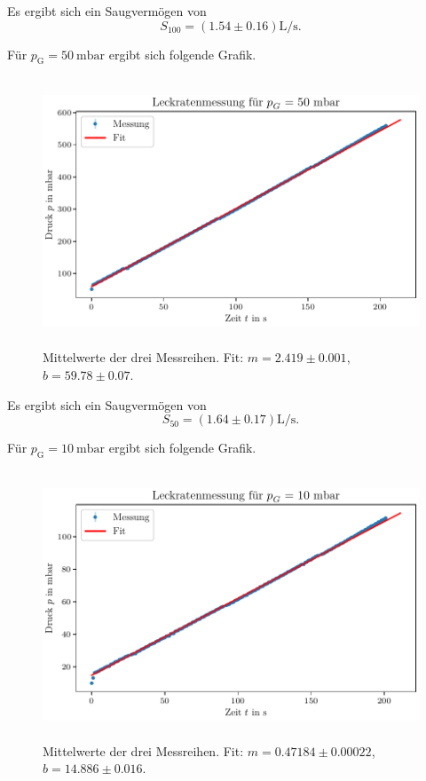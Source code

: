Es ergibt sich ein Saugvermögen von
\begin{equation}
    S_{100} = (\num{1.54} \pm \num{0.16}) \si{\liter\per\second}.
\end{equation}

Für $p_\text{G} = \SI{50}{\milli\bar}$ ergibt sich folgende Grafik.

\begin{figure}[H]
    \centering
    \includegraphics[width=\textwidth,height=8cm]{plots/DP_Leck_50mbar.pdf}
    \caption{Mittelwerte der drei Messreihen. Fit: $m = \num{2.419} \pm \num{0.001}$, $b = \num{59.78} \pm \num{0.07}$.}
    \label{fig:DP_Leck_50mbar_mittelwert}
\end{figure}

Es ergibt sich ein Saugvermögen von
\begin{equation}
    S_{50} = (\num{1.64} \pm \num{0.17}) \si{\liter\per\second}.
\end{equation}

Für $p_\text{G} = \SI{10}{\milli\bar}$ ergibt sich folgende Grafik.

\begin{figure}[H]
    \centering
    \includegraphics[width=\textwidth,height=8cm]{plots/DP_Leck_10mbar.pdf}
    \caption{Mittelwerte der drei Messreihen. Fit: $m = \num{0.47184} \pm \num{0.00022}$, $b = \num{14.886} \pm \num{0.016}$.}
    \label{fig:DP_Leck_10mbar_mittelwert}
\end{figure}

